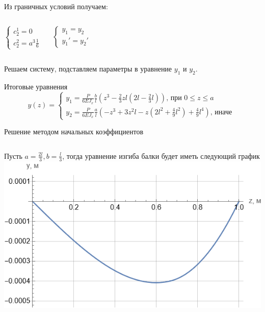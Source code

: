 \documentclass[ignoreonframetext,unicode]{beamer}
\begin{document}
\begin{frame}
	Из граничных условий получаем:
		\begin{columns}
		\begin{block}{}	
			\[
			\begin{cases}
				c_2^1 = 0\\
				c_2^2 = a^3 \frac{1}{6}
			\end{cases}
			\]
		\end{block}
				\begin{block}{}	
			\[
			\begin{cases}
				y_1 = y_2\\
				y_1' = y_2'
			\end{cases}
			\]
		\end{block}
	\end{columns}
\vspace*{2mm}
Решаем систему, подставляем параметры в уравнение $y_1$ и $y_2$.
\begin{block}{Итоговые уравнения}
	\[
		y(z) = 
	\begin{cases}
		y_1 = \frac{P}{6 E J_{x}} \frac{b}{l} (z^3 - \frac{2}{3} z l(2 l - \frac{2}{3}l))\mbox{, при } 0 \leqslant z \leqslant a\\
		y_2 = \frac{P}{6 E J_{x}} \frac{a}{l} (-z^3 + 3 z^2 l - z(2 l^2 + \frac{4}{9} l^2) + \frac{4}{9}l^4)\mbox{, иначе }
	\end{cases}
\]
\end{block}

\end{frame}

\begin{frame}{Решение методом начальных коэффициентов}
	\begin{columns}
		\column{0.35\textwidth}  
		Пусть $a = \frac{2 l}{3}, b = \frac{l}{3}$, тогда уравнение изгиба балки будет иметь следующий график
		\column{0.65\textwidth}  
		\includegraphics[width=\textwidth]{g.2}
	\end{columns}
\end{frame}
\end{document}
